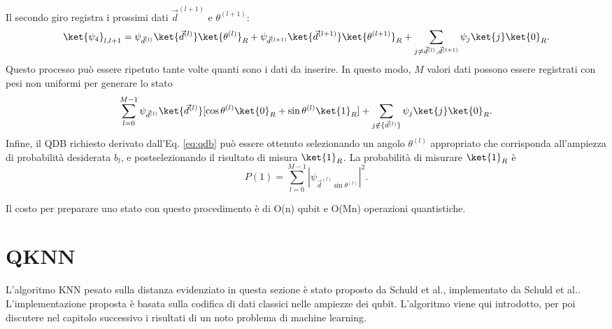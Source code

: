 Il secondo giro registra i prossimi dati $\vec{d}^{(l+1)}$ e $\theta^{(l+1)}$: 
\begin{equation}
    \ket{\psi_4}_{l,l+1} = \psi_{\vec{d}^{(l)}} \ket{\vec{d}^{(l)}} \ket{\theta^{(l)}}_R + 
    \psi_{\vec{d}^{(l+1)}} \ket{\vec{d}^{(l+1)}} \ket{\theta^{(l+1)}}_R + 
    \sum_{j \neq \vec{d}^{(l)},\vec{d}^{(l+1)}} \psi_j \ket{j} \ket{0}_R.
\end{equation}
Questo processo può essere ripetuto tante volte quanti sono i dati da inserire. 
In questo modo, $M$ valori dati possono essere registrati con pesi non uniformi per 
generare lo stato 
\begin{equation}
    \sum_{l=0}^{M-1} \psi_{\vec{d}^{(l)}} \ket{\vec{d}^{(l)}} [ \cos\theta^{(l)} \ket{0}_R + \sin\theta^{(l)} \ket{1}_R ] + 
    \sum_{j \notin \{ \vec{d}^{(l)} \}} \psi_j \ket{j} \ket{0}_R.
\end{equation}
Infine, il \ac{QDB} richiesto derivato dall'Eq. \ref{eq:qdb} può essere ottenuto 
selezionando un angolo $\theta^{(l)}$ appropriato che corrisponda all'ampiezza di 
probabilità desiderata $b_l$, e postselezionando il risultato di misura $\ket{1}_R$. 
La probabilità di misurare $\ket{1}_R$ è 
\begin{equation} \label{eq:qram.prob}
    P(1) = \sum_{l=0}^{M-1} |\psi_{\vec{d}^{(l)} \sin\theta^{(l)}} |^2.
\end{equation}



Il costo per preparare uno stato con questo procedimento è di O(n) qubit e O(Mn) operazioni quantistiche. 


\section{QKNN}

L'algoritmo \ac{KNN} pesato sulla distanza evidenziato in questa sezione è stato 
proposto da Schuld et al.\cite{10.1007/978-3-319-13560-1_17}, implementato da 
Schuld et al.\citep{schuld}.
L'implementazione proposta è basata sulla codifica di dati classici nelle ampiezze 
dei qubit. L'algoritmo viene qui introdotto, per poi discutere nel capitolo 
successivo i risultati di un noto problema di machine learning. 

